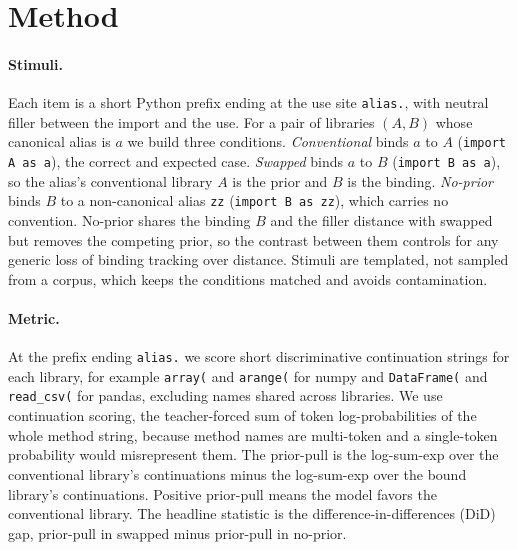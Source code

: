 \documentclass[11pt]{article}
\begin{document}
\section{Method}
\label{sec:method}

\paragraph{Stimuli.} Each item is a short Python prefix ending at the use site \texttt{alias.}, with neutral filler between the import and the use. For a pair of libraries $(A, B)$ whose canonical alias is $a$ we build three conditions. \emph{Conventional} binds $a$ to $A$ (\texttt{import A as a}), the correct and expected case. \emph{Swapped} binds $a$ to $B$ (\texttt{import B as a}), so the alias's conventional library $A$ is the prior and $B$ is the binding. \emph{No-prior} binds $B$ to a non-canonical alias \texttt{zz} (\texttt{import B as zz}), which carries no convention. No-prior shares the binding $B$ and the filler distance with swapped but removes the competing prior, so the contrast between them controls for any generic loss of binding tracking over distance. Stimuli are templated, not sampled from a corpus, which keeps the conditions matched and avoids contamination.

\paragraph{Metric.} At the prefix ending \texttt{alias.} we score short discriminative continuation strings for each library, for example \texttt{array(} and \texttt{arange(} for numpy and \texttt{DataFrame(} and \texttt{read\_csv(} for pandas, excluding names shared across libraries. We use continuation scoring, the teacher-forced sum of token log-probabilities of the whole method string, because method names are multi-token and a single-token probability would misrepresent them. The prior-pull is the log-sum-exp over the conventional library's continuations minus the log-sum-exp over the bound library's continuations. Positive prior-pull means the model favors the conventional library. The headline statistic is the difference-in-differences (DiD) gap, prior-pull in swapped minus prior-pull in no-prior.
\end{document}
